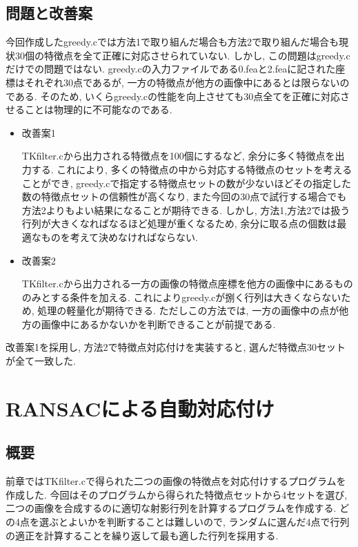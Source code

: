 \documentclass[a4j]{jarticle}
\begin{document}
\subsection{問題と改善案}
今回作成したgreedy.cでは方法1で取り組んだ場合も方法2で取り組んだ場合も現状30個の特徴点を全て正確に対応させられていない.
しかし, この問題はgreedy.cだけでの問題ではない. greedy.cの入力ファイルである0.feaと2.feaに記された座標はそれぞれ30点であるが, 一方の特徴点が他方の画像中にあるとは限らないのである. そのため, いくらgreedy.cの性能を向上させても30点全てを正確に対応させることは物理的に不可能なのである. 

\begin{itemize}
\item{改善案1}

TKfilter.cから出力される特徴点を100個にするなど, 余分に多く特徴点を出力する. 
これにより, 多くの特徴点の中から対応する特徴点のセットを考えることができ, greedy.cで指定する特徴点セットの数が少ないほどその指定した数の特徴点セットの信頼性が高くなり, また今回の30点で試行する場合でも方法2よりもよい結果になることが期待できる. 
しかし, 方法1,方法2では扱う行列が大きくなればなるほど処理が重くなるため, 余分に取る点の個数は最適なものを考えて決めなければならない.

\item{改善案2}

TKfilter.cから出力される一方の画像の特徴点座標を他方の画像中にあるもののみとする条件を加える. 
これによりgreedy.cが捌く行列は大きくならないため, 処理の軽量化が期待できる. 
ただしこの方法では, 一方の画像中の点が他方の画像中にあるかないかを判断できることが前提である. 

\end{itemize}

改善案1を採用し, 方法2で特徴点対応付けを実装すると, 選んだ特徴点30セットが全て一致した. 


\section{RANSACによる自動対応付け}

\subsection{概要}
前章ではTKfilter.cで得られた二つの画像の特徴点を対応付けするプログラムを作成した. 
今回はそのプログラムから得られた特徴点セットから4セットを選び, 二つの画像を合成するのに適切な射影行列を計算するプログラムを作成する. 
どの4点を選ぶとよいかを判断することは難しいので, ランダムに選んだ4点で行列の適正を計算することを繰り返して最も適した行列を採用する.
\end{document}
